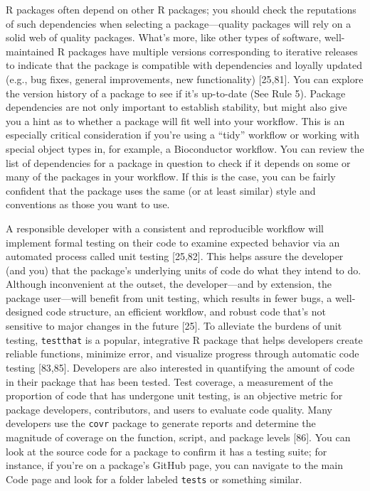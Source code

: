 \documentclass[10pt,letterpaper]{article}
\begin{document}
R packages often depend on other R packages; you should check the
reputations of such dependencies when selecting a package---quality
packages will rely on a solid web of quality packages. What's more, like
other types of software, well-maintained R packages have multiple
versions corresponding to iterative releases to indicate that the
package is compatible with dependencies and loyally updated (e.g., bug
fixes, general improvements, new functionality) {[}25,81{]}. You can
explore the version history of a package to see if it's up-to-date (See
Rule 5). Package dependencies are not only important to establish
stability, but might also give you a hint as to whether a package will
fit well into your workflow. This is an especially critical
consideration if you're using a ``tidy'' workflow or working with
special object types in, for example, a Bioconductor workflow. You can
review the list of dependencies for a package in question to check if it
depends on some or many of the packages in your workflow. If this is the
case, you can be fairly confident that the package uses the same (or at
least similar) style and conventions as those you want to use.

A responsible developer with a consistent and reproducible workflow will
implement formal testing on their code to examine expected behavior via
an automated process called unit testing {[}25,82{]}. This helps assure
the developer (and you) that the package's underlying units of code do
what they intend to do. Although inconvenient at the outset, the
developer---and by extension, the package user---will benefit from unit
testing, which results in fewer bugs, a well-designed code structure, an
efficient workflow, and robust code that's not sensitive to major
changes in the future {[}25{]}. To alleviate the burdens of unit
testing, \texttt{testthat} is a popular, integrative R package that
helps developers create reliable functions, minimize error, and
visualize progress through automatic code testing {[}83,85{]}.
Developers are also interested in quantifying the amount of code in
their package that has been tested. Test coverage, a measurement of the
proportion of code that has undergone unit testing, is an objective
metric for package developers, contributors, and users to evaluate code
quality. Many developers use the \texttt{covr} package to generate
reports and determine the magnitude of coverage on the function, script,
and package levels {[}86{]}. You can look at the source code for a
package to confirm it has a testing suite; for instance, if you're on a
package's GitHub page, you can navigate to the main Code page and look
for a folder labeled \texttt{tests} or something similar.
\end{document}
